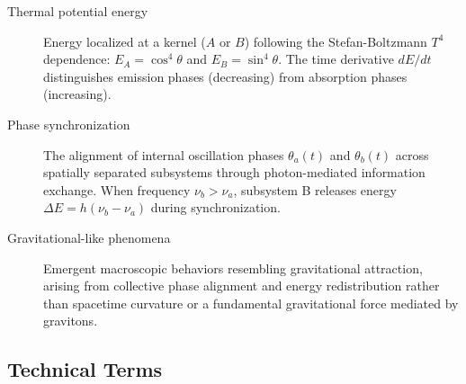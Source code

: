 \documentclass[12pt,letterpaper]{article}
\begin{document}
\begin{description}
\item[Thermal potential energy] Energy localized at a kernel ($A$ or $B$) following the Stefan-Boltzmann $T^4$ dependence: $E_A = \cos^4\theta$ and $E_B = \sin^4\theta$. The time derivative $dE/dt$ distinguishes emission phases (decreasing) from absorption phases (increasing).

\item[Phase synchronization] The alignment of internal oscillation phases $\theta_a(t)$ and $\theta_b(t)$ across spatially separated subsystems through photon-mediated information exchange. When frequency $\nu_b > \nu_a$, subsystem B releases energy $\Delta E = h(\nu_b - \nu_a)$ during synchronization.

\item[Gravitational-like phenomena] Emergent macroscopic behaviors resembling gravitational attraction, arising from collective phase alignment and energy redistribution rather than spacetime curvature or a fundamental gravitational force mediated by gravitons.

\end{description}

\subsection*{Technical Terms}
\end{document}
